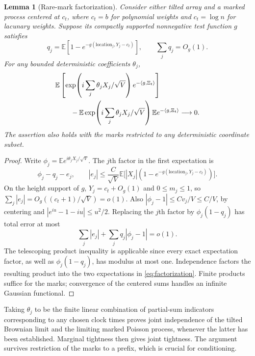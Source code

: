 \documentclass[11pt,a4paper]{article}
\numberwithin{equation}{section}
\newtheorem{lemma}[theorem]{Lemma}
\theoremstyle{definition}
\theoremstyle{remark}
\newcommand{\E}{\mathbb E}
\begin{document}
\begin{lemma}[Rare-mark factorization]
\label{lem:factorization}
Consider either tilted array and a marked process centered at $c_t$,
where $c_t=b$ for polynomial weights and $c_t=\log n$ for lacunary
weights. Suppose its compactly supported nonnegative test function
$g$ satisfies
\[
 q_j=\E[1-e^{-g(\text{location}_j,Y_j-c_t)}],\qquad
 \sum_jq_j=O_g(1).
\]
For any bounded deterministic coefficients $\theta_j$,
\begin{align}
 &\E\left[\exp\!\left(i\sum_j\theta_jX_j/\sqrt V\right)
                  e^{-\langle g,\Xi_t\rangle}\right]
 \nonumber\\
 &\hspace{8mm}{}-
 \E\exp\!\left(i\sum_j\theta_jX_j/\sqrt V\right)
       \E e^{-\langle g,\Xi_t\rangle}\longrightarrow0.
 \label{eq:factorization}
\end{align}
The assertion also holds with the marks restricted to any deterministic
coordinate subset.
\end{lemma}
\begin{proof}
Write $\phi_j=\E e^{i\theta_jX_j/\sqrt V}$. The $j$th factor in
the first expectation is
\[
 \phi_j-q_j-e_j,\qquad
 |e_j|\le\frac{C}{\sqrt V}
     \E\big[|X_j|(1-e^{-g(\text{location}_j,Y_j-c_t)})\big].
\]
On the height support of $g$, $Y_j=c_t+O_g(1)$ and $0\le m_j\le1$,
so $\sum_j|e_j|=O_g((c_t+1)/\sqrt V)=o(1)$.
Also $|\phi_j-1|\le C v_j/V\le C/V$, by centering and
$|e^{iu}-1-iu|\le u^2/2$. Replacing the $j$th factor by
$\phi_j(1-q_j)$ has total error at most
\[
 \sum_j|e_j|+\sum_jq_j|\phi_j-1|=o(1).
\]
The telescoping product inequality is applicable since every exact
expectation factor, as well as $\phi_j(1-q_j)$, has modulus at most
one. Independence factors the resulting product into the two
expectations in \eqref{eq:factorization}. Finite products suffice for
the marks; convergence of the centered sums handles an infinite
Gaussian functional.
\end{proof}
Taking $\theta_j$ to be the finite linear combination of partial-sum
indicators corresponding to any chosen clock times proves joint
independence of the tilted Brownian limit and the limiting marked
Poisson process, whenever the latter has been established. Marginal
tightness then gives joint tightness. The argument survives restriction
of the marks to a prefix, which is crucial for conditioning.
\end{document}
